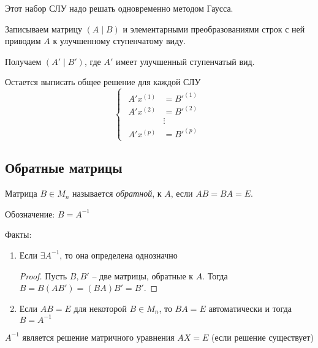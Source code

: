 Этот набор СЛУ надо решать одновременно методом Гаусса.

Записываем матрицу $(A \mid B)$ и элементарными преобразованиями строк с ней приводим $A$ к улучшенному ступенчатому виду.

Получаем $(A' \mid B')$, где $A'$ имеет улучшенный ступенчатый вид.

Остается выписать общее решение для каждой СЛУ
\begin{equation*}
    \begin{cases}
        \begin{aligned}
            A' x^{(1)} &= B'^{(1)} \\
            A' x^{(2)} &= B'^{(2)} \\
            &\vdots \\
            A' x^{(p)} &= B'^{(p)}
        \end{aligned}
    \end{cases}
\end{equation*}


\subsection{Обратные матрицы}

\begin{definition}
    Матрица $B \in M_n$ называется \textit{обратной}, к $A$, если $AB = BA = E$.

    Обозначение: $B = A^{-1}$
\end{definition}

Факты:
\begin{enumerate}
\item Если $\exists A^{-1}$, то она определена однозначно

    \begin{proof}
        Пусть $B, B'$ -- две матрицы, обратные к $A$. Тогда $B = B(AB') = (BA)B' = B'$.
    \end{proof}

\item Если $AB = E$ для некоторой $B \in M_n$, то $BA = E$ автоматически и тогда $B = A^{-1}$

    \begin{comment}
        Доказывается на \hyperref[proof:ab_inverse]{Лекции 8}.
    \end{comment}
\end{enumerate}

\begin{corollary}
    $A^{-1}$ является решение матричного уравнения $AX = E$ (если решение существует)
\end{corollary}

